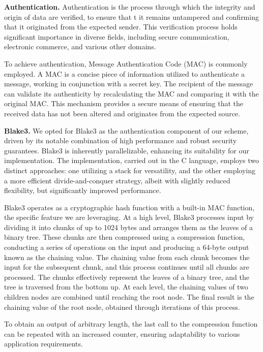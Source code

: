 \documentclass[letterpaper]{article}
\newcommand{\mypar}[1]{{\bf #1.}}
\begin{document}
\mypar{Authentication}
Authentication is the process through which the integrity and origin of data are verified, to ensure that
t it remains untampered and confirming that it originated from the expected sender. This verification process holds significant importance in diverse fields, including secure communication, electronic commerce, and various other domains.

To achieve authentication, Message Authentication Code (MAC) is commonly employed. A MAC is a concise piece of information utilized to authenticate a message, working in conjunction with a secret key. The recipient of the message can validate its authenticity by recalculating the MAC and comparing it with the original MAC. This mechanism provides a secure means of ensuring that the received data has not been altered and originates from the expected source.

\mypar{Blake3}
We opted for Blake3 as the authentication component of our scheme, driven by its notable combination of high performance and robust security guarantees. Blake3 is inherently parallelizable, enhancing its suitability for our implementation. The implementation, carried out in the C language, employs two distinct approaches: one utilizing a stack for versatility, and the other employing a more efficient divide-and-conquer strategy, albeit with slightly reduced flexibility, but significantly improved performance.

Blake3 operates as a cryptographic hash function with a built-in MAC function, the specific feature we are leveraging. At a high level, Blake3 processes input by dividing it into chunks of up to 1024 bytes and arranges them as the leaves of a binary tree. These chunks are then compressed using a compression function, conducting a series of operations on the input and producing a 64-byte output known as the chaining value. The chaining value from each chunk becomes the input for the subsequent chunk, and this process continues until all chunks are processed. The chunks effectively represent the leaves of a binary tree, and the tree is traversed from the bottom up. At each level, the chaining values of two children nodes are combined until reaching the root node. The final result is the chaining value of the root node, obtained through iterations of this process.

To obtain an output of arbitrary length, the last call to the compression function can be repeated with an increased counter, ensuring adaptability to various application requirements.
\end{document}
